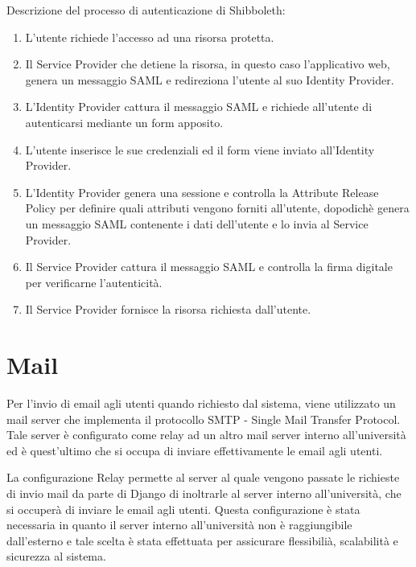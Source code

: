 Descrizione del processo di autenticazione di Shibboleth:
\begin{enumerate}
    \item L'utente richiede l'accesso ad una risorsa protetta.
    \item Il Service Provider che detiene la risorsa, in questo caso l'applicativo web, genera un messaggio SAML e redireziona l'utente al suo Identity Provider.
    \item L'Identity Provider cattura il messaggio SAML e richiede all'utente di autenticarsi mediante un form apposito.
    \item L'utente inserisce le sue credenziali ed il form viene inviato all'Identity Provider.
    \item L'Identity Provider genera una sessione e controlla la Attribute Release Policy per definire quali attributi vengono forniti all'utente, dopodichè genera un messaggio SAML contenente i dati dell'utente e lo invia al Service Provider.
    \item Il Service Provider cattura il messaggio SAML e controlla la firma digitale per verificarne l'autenticità.
    \item Il Service Provider fornisce la risorsa richiesta dall'utente.
\end{enumerate}
\section{Mail}
Per l'invio di email agli utenti quando richiesto dal sistema, viene utilizzato un mail server che implementa il protocollo SMTP - Single Mail Transfer Protocol. Tale server è configurato come relay ad un altro mail server interno all'università ed è quest'ultimo che si occupa di inviare effettivamente le email agli utenti.

La configurazione Relay permette al server al quale vengono passate le richieste di invio mail da parte di Django di inoltrarle al server interno all'università, che si occuperà di inviare le email agli utenti. Questa configurazione è stata necessaria in quanto il server interno all'università non è raggiungibile dall'esterno e tale scelta è stata effettuata per assicurare flessibilià, scalabilità e sicurezza al sistema.


\clearpage
